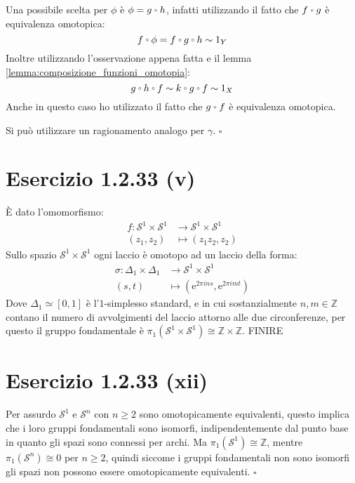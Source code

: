 \documentclass[10pt]{scrartcl}
\newcommand{\Z}{\mathbb{Z}}
\newcommand{\Sph}[1][]{\mathcal{S}^#1}
\let\latexcirc=\circ
\newcommand{\ccirc}{\mathbin{\mathchoice
  {\xcirc\scriptstyle}
  {\xcirc\scriptstyle}
  {\xcirc\scriptscriptstyle}
  {\xcirc\scriptscriptstyle}
}}
\newcommand{\xcirc}[1]{\vcenter{\hbox{$#1\latexcirc$}}}
\let\circ\ccirc
\begin{document}
Una possibile scelta per $ \phi $ è $ \phi = g \circ h $, infatti utilizzando
il fatto che $ f \circ g $ è equivalenza omotopica:
\[
  f \circ \phi = f \circ g \circ h \sim 1_Y
\]
Inoltre utilizzando l'osservazione appena fatta e il lemma
\ref{lemma:composizione_funzioni_omotopia}:
\[
  g \circ h \circ f \sim k \circ g \circ f \sim 1_X
\]
Anche in questo caso ho utilizzato il fatto che $ g \circ f $ è equivalenza
omotopica.

Si può utilizzare un ragionamento analogo per $ \gamma $.
\hfill $ \square $

\section{Esercizio 1.2.33 (v)}
È dato l'omomorfismo:
\begin{align*}
  f \colon \Sph{1} \times \Sph{1} & \to  \Sph{1} \times \Sph{1} \\
  (z_1, z_2) & \mapsto (z_1 z_2, z_2)
\end{align*}
Sullo spazio $ \Sph{1} \times \Sph{1} $ ogni laccio è
omotopo ad un laccio della forma:
\begin{align*}
  \sigma \colon \Delta_1 \times \Delta_1 & \to \Sph{1} \times \Sph{1} \\
  (s,t) & \mapsto (\mathrm{e}^{2 \pi i n s}, \mathrm{e}^{2 \pi i m t})
\end{align*}
Dove $ \Delta_1 \simeq [0,1] $ è l'$ 1 $-simplesso standard, e in
cui sostanzialmente $ n, m \in \Z $ contano il numero
di avvolgimenti del laccio attorno alle due circonferenze,
per questo il gruppo fondamentale è $ \pi_1(\Sph{1} \times \Sph{1})
\cong \Z \times \Z $.
{\huge FINIRE}

\section{Esercizio 1.2.33 (xii)}
Per assurdo $ \Sph{1} $ e $ \Sph{n} $ con $ n \geq 2 $ sono omotopicamente
equivalenti, questo implica che i loro gruppi fondamentali sono isomorfi,
indipendentemente dal punto base in quanto gli spazi sono connessi per archi.
Ma $ \pi_1(\Sph{1}) \cong \Z $, mentre $ \pi_1(\Sph{n}) \cong 0 $ per $ n \geq 2 $, quindi
siccome i gruppi fondamentali non sono isomorfi gli spazi non possono
essere omotopicamente equivalenti.
\hfill $ \square $
\end{document}
